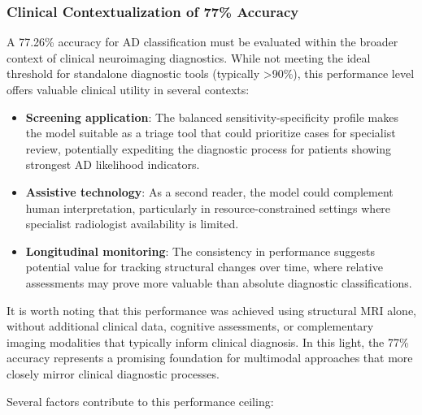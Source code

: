 \documentclass[12pt, a4paper]{article}
\begin{document}
\subsubsection{Clinical Contextualization of 77\% Accuracy}

A 77.26\% accuracy for AD classification must be evaluated within the broader context of clinical neuroimaging diagnostics. While not meeting the ideal threshold for standalone diagnostic tools (typically >90\%), this performance level offers valuable clinical utility in several contexts:

\begin{itemize}
    \item \textbf{Screening application}: The balanced sensitivity-specificity profile makes the model suitable as a triage tool that could prioritize cases for specialist review, potentially expediting the diagnostic process for patients showing strongest AD likelihood indicators.
    
    \item \textbf{Assistive technology}: As a second reader, the model could complement human interpretation, particularly in resource-constrained settings where specialist radiologist availability is limited.
    
    \item \textbf{Longitudinal monitoring}: The consistency in performance suggests potential value for tracking structural changes over time, where relative assessments may prove more valuable than absolute diagnostic classifications.
\end{itemize}

It is worth noting that this performance was achieved using structural MRI alone, without additional clinical data, cognitive assessments, or complementary imaging modalities that typically inform clinical diagnosis. In this light, the 77\% accuracy represents a promising foundation for multimodal approaches that more closely mirror clinical diagnostic processes.

Several factors contribute to this performance ceiling:
\end{document}
